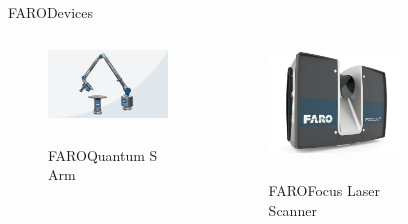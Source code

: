 \documentclass[10pt]{beamer}
\newcommand{\faro}[0]{FARO\textsuperscript{\textregistered}}
\begin{document}
  \begin{frame}{\faro Devices}
    \begin{columns}
      \begin{column}{0.35\textwidth}
        \begin{figure}
          \centering
          \includegraphics[width=\textwidth]{images/faro_quantum_s_arm.png}
          \caption{\\\faro Quantum S Arm}
        \end{figure}
      \end{column}
      \begin{column}{0.35\textwidth}
        \begin{figure}
          \centering
          \includegraphics[width=0.8\textwidth]{images/faro_scanner.jpg}
          \caption{\\\faro Focus Laser Scanner}
        \end{figure}
      \end{column}
      \begin{column}{0.35\textwidth}
        \begin{figure}

\end{figure}
\end{column}
\end{columns}
\end{frame}
\end{document}
